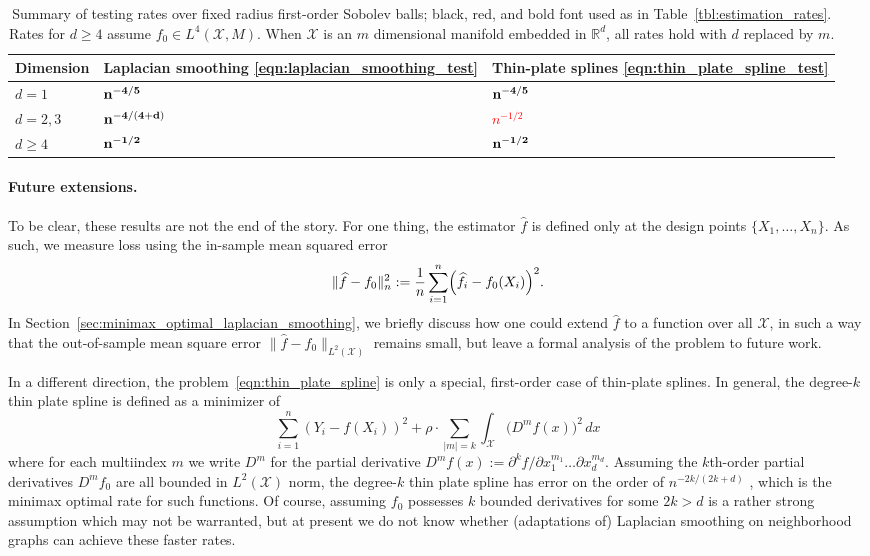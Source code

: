 \documentclass[twoside]{article}
\newcommand{\Reals}{\mathbb{R}}
\newcommand{\1}{\mathbf{1}}
\newcommand{\Rd}{\Reals^d}
\newcommand{\Xset}{\mathcal{X}}
\newcommand{\Leb}{L}
\newcommand{\wh}[1]{\widehat{#1}}
\theoremstyle{definition}
\theoremstyle{remark}
\begin{document}
\begin{table}
	\begin{center}
		\begin{tabular}{p{} | p{} p{} }
			Dimension & Laplacian smoothing \eqref{eqn:laplacian_smoothing_test} & Thin-plate splines \eqref{eqn:thin_plate_spline_test} \\
			\hline
			$d = 1$ & ${\bf n^{-4/5}}$ & \textcolor{red}{${\bf n^{-4/5}}$} \\
			$d = 2,3$ & ${\bf n^{-4/(4 + d)}}$ & \textcolor{red}{$n^{-1/2}$} \\
			$d \geq 4$\footnotemark & ${ \bf n^{-1/2}}$ & \textcolor{red}{${ \bf n^{-1/2}}$}
		\end{tabular}
	\end{center}
	\caption{Summary of testing rates over fixed radius first-order Sobolev balls; black, red, and bold font used as in Table~\ref{tbl:estimation_rates}. Rates for $d \geq 4$ assume $f_0 \in \Leb^4(\Xset,M)$. When $\Xset$ is an $m$ dimensional manifold embedded in $\Rd$, all rates hold with $d$ replaced by $m$.}
	\label{tbl:testing_rates}
\end{table}
\footnotetext{Assuming $f_0 \in \Leb^4(\Xset,M)$.}
\paragraph{Future extensions.}
To be clear, these results are not the end of the story. For one thing, the estimator $\wh{f}$ is defined only at the design points $\{X_1,\ldots,X_n\}$. As such, we measure loss using the in-sample mean squared error 
\begin{equation*}
\|\wh{f} - f_0\|_n^2 := \frac{1}{n}\sum_{i = 1}^{n} \Bigl(\wh{f}_i - f_0(X_i)\Bigr)^2.
\end{equation*}
In Section~\ref{sec:minimax_optimal_laplacian_smoothing}, we briefly discuss how one could extend $\wh{f}$ to a function over all $\Xset$, in such a way that the out-of-sample mean square error $\|\wh{f} - f_0\|_{\Leb^2(\Xset)}$ remains small, but leave a formal analysis of the problem to future work.

In a different direction, the problem~\eqref{eqn:thin_plate_spline} is only a special, first-order case of thin-plate splines. In general, the degree-$k$ thin plate spline is defined as a minimizer of
\begin{equation*}
\sum_{i = 1}^{n} (Y_i - f(X_i))^2 + \rho \cdot \sum_{|m| = k} \int_{\Xset} \bigl(D^mf(x)\bigr)^2 \,dx
\end{equation*}
where for each multiindex $m$ we write $D^m$ for the partial derivative $D^mf(x):= \partial^kf/\partial x_{1}^{m_1}\ldots \partial x_{d}^{m_d}$. Assuming the $k$th-order partial derivatives $D^mf_0$ are all bounded in $\Leb^2(\Xset)$ norm, the degree-$k$ thin plate spline has error on the order of $n^{-2k/(2k + d)}$ \citep{vandergeer2000}, which is the minimax optimal rate for such functions. Of course, assuming $f_0$ possesses $k$ bounded derivatives for some $2k > d$ is a rather strong assumption which may not be warranted, but at present we do not know whether (adaptations of) Laplacian smoothing on neighborhood graphs can achieve these faster rates.
\end{document}
